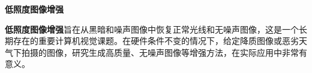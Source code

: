 \documentclass[CJK,aspectratio=169]{beamer}  %
\begin{document}
	\begin{frame}
	{ \yahei \textbf{低照度图像增强}}
	
	\vspace{0.1cm}

	{ \yahei \textbf{低照度图像增强}旨在从黑暗和噪声图像中恢复正常光线和无噪声图像，这是一个长期存在的重要计算机视觉课题。在硬件条件不变的情况下，给定降质图像或恶劣天气下拍摄的图像，研究生成高质量、无噪声图像等增强方法，在实际应用中非常有意义。}

		
	\begin{figure}
		\centering
		\setlength{\abovecaptionskip}{-0.15cm}
		\begin{minipage}{.08\paperwidth}
			\centering
			\setlength{\abovecaptionskip}{-0.45cm}

\end{minipage}
\end{figure}
\end{frame}
\end{document}
